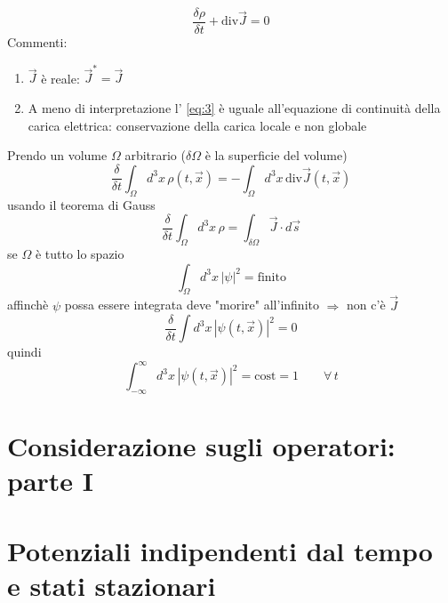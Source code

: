 \documentclass[a4paper,11pt]{report}
\theoremstyle{remark}
\theoremstyle{definition}
\begin{document}
\begin{equation}
    \label{eq:3}
    \frac{\delta \rho}{\delta t} + \mbox{div}\vec{J} = 0
\end{equation}
Commenti:
\begin{enumerate}
    \item $\vec{J}$ è reale: $\vec{J}^* = \vec{J}$
    \item A meno di interpretazione l' \autoref{eq:3} è uguale all'equazione di continuità della carica elettrica: conservazione della carica locale e non globale
\end{enumerate}
Prendo un volume $\Omega$ arbitrario ($\delta \Omega$ è la superficie del volume)
\begin{equation*}
    \frac{\delta}{\delta t } \int_\Omega d^3x \, \rho(t,\vec{x}) = - \int_\Omega d^3x \, \mbox{div}\vec{J}(t,\vec{x})
\end{equation*}
usando il teorema di Gauss
\begin{equation*}
    \frac{\delta}{\delta t} \int_\Omega d^3x \, \rho = \int_{\delta\Omega} \vec{J} \cdot d\vec{s} 
\end{equation*}
se $\Omega$ è tutto lo spazio 
\begin{equation*}
    \int_\Omega d^3x \, {|\psi|}^2 = \mbox{finito}
\end{equation*}
affinchè $\psi$ possa essere integrata deve "morire" all'infinito $\Rightarrow$ non c'è $\vec{J}$
\begin{equation*}
    \frac{\delta}{\delta t} \int d^3x \, {|\psi(t,\vec{x})|}^2 = 0
\end{equation*}
quindi
\begin{equation*}
    \int_{-\infty}^\infty d^3x \, {|\psi(t,\vec{x})|}^2 = \mbox{cost} = 1 \qquad \forall \, t
\end{equation*}

\chapter{Considerazione sugli operatori: parte I}

\chapter{Potenziali indipendenti dal tempo e stati stazionari}
\end{document}
